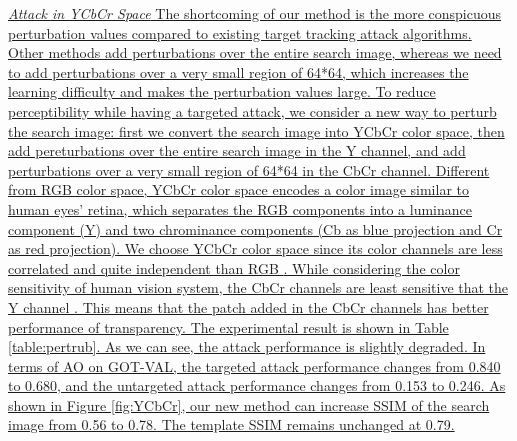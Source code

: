 \documentclass[12pt]{article}
\begin{document}
\uline{\textit{Attack in YCbCr Space}
The shortcoming of our method is the more conspicuous perturbation values compared to existing target tracking attack algorithms.
Other methods add perturbations over the entire search image, whereas we need to add perturbations over a very small region of 64*64, which increases the learning difficulty and makes the perturbation values large.
To reduce perceptibility while having a targeted attack, we consider a new way to perturb the search image: first we convert the search image into YCbCr color space, then add pereturbations over the entire search image in the Y channel, and add perturbations over a very small region of 64*64 in the CbCr channel.
Different from RGB color space, YCbCr color space encodes a color image similar to human eyes’ retina, which separates the RGB components into a luminance component (Y) and two chrominance components (Cb as blue projection and Cr as red projection).
We choose YCbCr color space since its color channels are less correlated and quite independent than RGB \cite{8630918}.
While considering the color sensitivity of human vision system, the CbCr channels are least sensitive that the Y channel \cite{8630918}. This means that the patch added in the CbCr channels has better performance of transparency.
The experimental result is shown in Table \ref{table:pertrub}. As we can see,
the attack performance is slightly degraded. In terms of AO on GOT-VAL, the targeted attack performance changes from 0.840 to 0.680, and the untargeted attack performance changes from 0.153 to 0.246.
As shown in Figure \ref{fig:YCbCr}, our new method can increase SSIM of the search image from 0.56 to 0.78. The template SSIM remains unchanged at 0.79.
}
\end{document}
